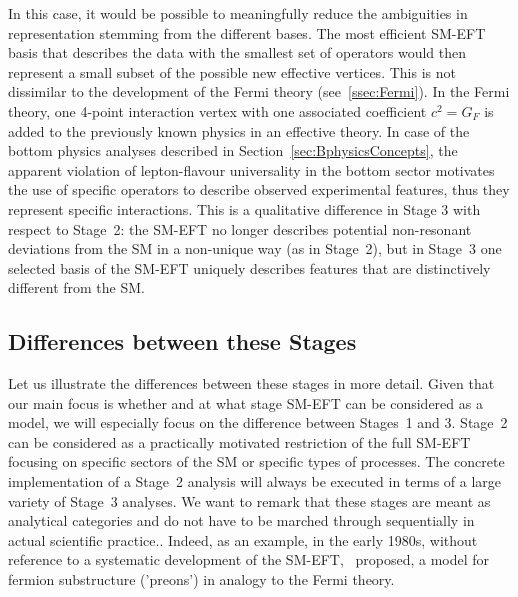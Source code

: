 In this case, it would be possible to meaningfully reduce the
ambiguities in representation stemming from the different bases. The
most efficient SM-EFT basis that describes the data with the
smallest set of operators would then represent a small subset of the
possible new effective vertices.  This is not dissimilar to the
development of the Fermi theory (see~\ref{ssec:Fermi}). In the Fermi
theory, one 4-point interaction vertex with one associated coefficient
$c^2=G_F$ is added to the previously known physics in an effective
theory. In case of the bottom physics analyses described in Section~\ref{sec:BphysicsConcepts}, the apparent
violation of lepton-flavour universality in the bottom sector motivates
the use of specific operators to describe observed experimental
features, thus they represent specific interactions. This is a
qualitative difference in Stage 3 with respect to Stage~2: the SM-EFT
no longer describes potential non-resonant deviations from the
SM in a non-unique way (as in Stage~2), but in Stage~3 one selected basis of the SM-EFT uniquely describes features that are distinctively different from the SM.

\subsection{Differences between these Stages}

Let us illustrate the differences between these stages in more detail. 
Given that our main focus is whether and at what stage SM-EFT can be considered as a model, we will especially focus on the difference between Stages~1 and 3. 
Stage~2 can be considered as a practically motivated restriction of the full SM-EFT focusing on specific sectors of the SM or specific types of processes. 
The concrete implementation of a Stage~2 analysis will always be executed in terms of a large variety of Stage~3 analyses. 
We want to remark that these stages are meant as analytical categories and do not have to be marched through sequentially in actual scientific practice..
Indeed, as an example, in the early 1980s, without reference to
a systematic development of the SM-EFT,~\citep{Eichten:1983hw} proposed,
a model for fermion substructure ('preons') in analogy to the Fermi theory.

